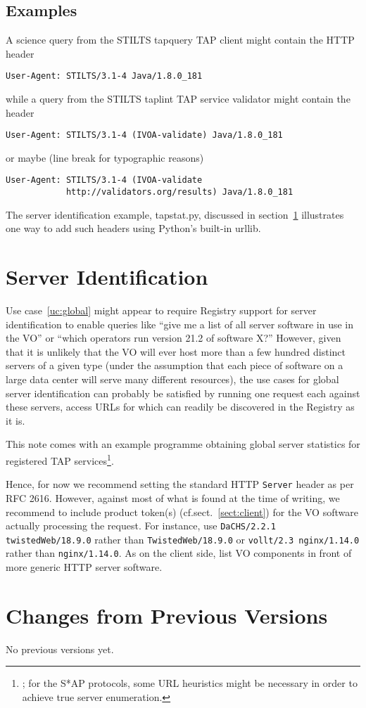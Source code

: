 \documentclass[11pt,a4paper]{ivoa}
\newcommand{\headername}[1]{{\tt #1}}
\begin{document}
\subsection{Examples}

A science query from the STILTS tapquery TAP client might contain the
HTTP header
\begin{verbatim}
User-Agent: STILTS/3.1-4 Java/1.8.0_181
\end{verbatim}
while a query from the STILTS taplint TAP service validator might
contain the header
\begin{verbatim}
User-Agent: STILTS/3.1-4 (IVOA-validate) Java/1.8.0_181
\end{verbatim}
or maybe (line break for typographic reasons)
\begin{verbatim}
User-Agent: STILTS/3.1-4 (IVOA-validate
            http://validators.org/results) Java/1.8.0_181
\end{verbatim}

The server identification example, tapstat.py, discussed in
section~\ref{sect:server} illustrates one way to add such headers using
Python's built-in urllib.


\section{Server Identification}
\label{sect:server}

Use case~\ref{uc:global} might appear to require Registry support for
server identification to enable queries like ``give me a list of all
server software in use in the VO'' or ``which operators run version 21.2
of software X?''  However, given that it is unlikely that the VO will
ever host more than a few hundred distinct servers of a given type
(under the assumption that each piece of software on a large data center
will serve many different resources), the use cases for global server
identification can probably be satisfied by running one request each
against these servers, access URLs for which can readily be discovered
in the Registry as it is.  

This note comes with an example programme obtaining global server
statistics for registered TAP
services\footnote{; for the S*AP protocols,
some URL heuristics might be necessary in order to achieve true server
enumeration.}.

Hence, for now we recommend setting the standard HTTP
\headername{Server} header as
per RFC 2616.  However, against most of what is found at the time of
writing, we recommend to include product token(s)
(cf.sect.~\ref{sect:client}) for the VO software actually processing the
request.  For instance, use \verb|DaCHS/2.2.1 twistedWeb/18.9.0| rather than
\verb|TwistedWeb/18.9.0| or \verb|vollt/2.3 nginx/1.14.0| rather than
\verb|nginx/1.14.0|.  As on the client side, list VO components in front
of more generic HTTP server software.

\appendix
\section{Changes from Previous Versions}

No previous versions yet.  



\end{document}
